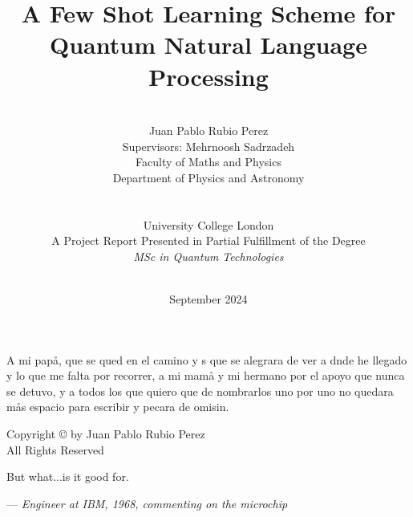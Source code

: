 \documentclass[12pt, a4paper]{report}
\date{September 2024}
\title{A Few Shot Learning Scheme for Quantum Natural Language Processing}
\author{\\ \Large{Juan Pablo Rubio Perez}
\\ Supervisors: Mehrnoosh Sadrzadeh
\\ Faculty of Maths and Physics
\\ Department of Physics and Astronomy
\\ 
\\
\\ University College London
\\
A Project Report Presented in Partial Fulfillment of the Degree \\ \textit{MSc in Quantum Technologies}
\\ \\
}
\begin{document}
      

\thispagestyle{headings}
\maketitle
\FloatBarrier
{}

\thispagestyle{empty}
\begin{abstract}


\end{abstract}
\newpage
\thispagestyle{empty}
\begin{center}
A mi pap\aa, que se qued\oo \vspace{1pt} en el camino y s\ee \vspace{1pt} que se alegrar\ii a de ver a d\oo nde he llegado y lo que me falta por recorrer, a mi mam\aa \vspace{1pt} y mi hermano por el apoyo que nunca se detuvo, y a todos los que quiero que de nombrarlos uno por uno no quedar\ii a m\aa s espacio para escribir y pecar\ii a de omisi\oo n.
\end{center}

\newpage
\thispagestyle{empty}
\vspace*{\fill}
\begin{center}
Copyright \copyright  {} by Juan Pablo Rubio Perez \\ All Rights Reserved
\end{center}
\vspace*{\fill}
\newpage
\thispagestyle{empty}
\epigraph{But what...is it good for.}{--- \textup{\textit{Engineer at IBM, 1968, commenting on the microchip}}}
\end{document}
